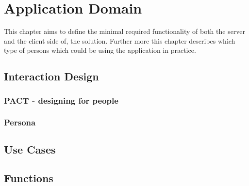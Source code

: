 \chapter{Application Domain}
This chapter aims to define the minimal required functionality of both the server and the client side of, the solution. Further more this chapter describes which type of persons which could be using the application in practice. 


\section{Interaction Design}
\subsection{PACT - designing for people}\label{pact}


\subsection{Persona}


\section{Use Cases}\label{usecase}


\section{Functions}

